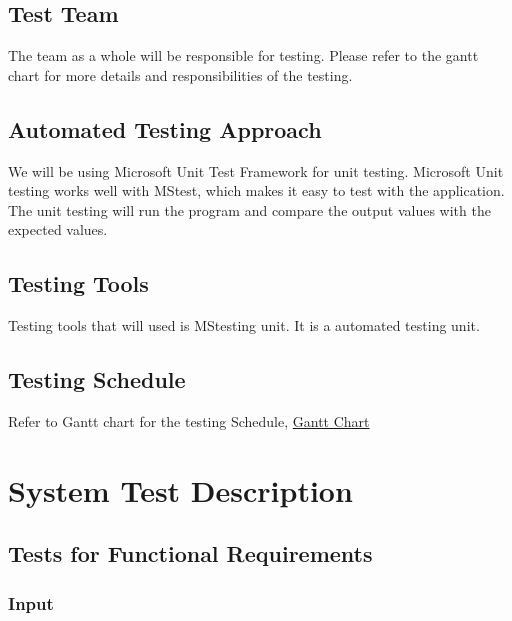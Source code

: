 \documentclass[12pt, titlepage]{article}
\begin{document}
\subsection{Test Team}
The team as a whole will be responsible for testing. Please refer to the gantt chart for more details and responsibilities of the testing.

\subsection{Automated Testing Approach}
We will be using Microsoft Unit Test Framework for unit testing. Microsoft Unit testing works well with MStest, which makes it easy to test with the application. The unit testing will run the program and compare the output values with the expected values.
\subsection{Testing Tools}
Testing tools that will used is MStesting unit. It is a automated testing unit.
\subsection{Testing Schedule}
Refer to Gantt chart for the testing Schedule, \href{run:../../ProjectSchedule/Gantt Chart.gan}{Gantt Chart} 

\section{System Test Description}
	
\subsection{Tests for Functional Requirements} \label{section:31}

\subsubsection{Input}
\end{document}
